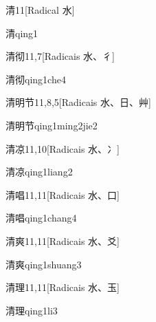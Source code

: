 \begin{entry}{清}{11}[Radical ⽔]
  \begin{phonetics}{清}{qing1}
  \end{phonetics}
\end{entry}

\begin{entry}{清彻}{11,7}[Radicais ⽔、⼻]
  \begin{phonetics}{清彻}{qing1che4}
  \end{phonetics}
\end{entry}

\begin{entry}{清明节}{11,8,5}[Radicais ⽔、⽇、⾋]
  \begin{phonetics}{清明节}{qing1ming2jie2}
  \end{phonetics}
\end{entry}

\begin{entry}{清凉}{11,10}[Radicais ⽔、⼎]
  \begin{phonetics}{清凉}{qing1liang2}
  \end{phonetics}
\end{entry}

\begin{entry}{清唱}{11,11}[Radicais ⽔、⼝]
  \begin{phonetics}{清唱}{qing1chang4}
  \end{phonetics}
\end{entry}

\begin{entry}{清爽}{11,11}[Radicais ⽔、⽘]
  \begin{phonetics}{清爽}{qing1shuang3}
  \end{phonetics}
\end{entry}

\begin{entry}{清理}{11,11}[Radicais ⽔、⽟]
  \begin{phonetics}{清理}{qing1li3}
  \end{phonetics}
\end{entry}

